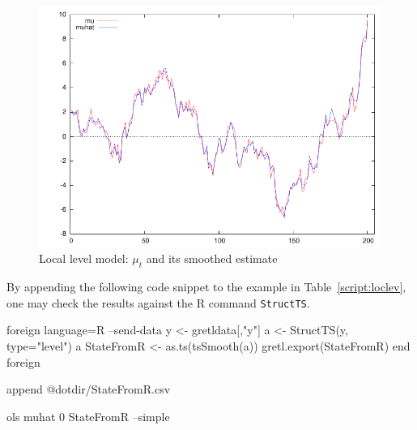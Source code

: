\begin{figure}[htbp]
  \centering
  \includegraphics{figures/local_level}
  \caption{Local level model: $\mu_t$ and its smoothed estimate}
  \label{fig:loclev}
\end{figure}
By appending the following code snippet to the example in
Table~\ref{script:loclev}, one may check the results against the
\textsf{R} command \texttt{StructTS}.

\begin{code}
foreign language=R --send-data
  y <- gretldata[,"y"]
  a <- StructTS(y, type="level")
  a
  StateFromR <- as.ts(tsSmooth(a))
  gretl.export(StateFromR)
end foreign

append @dotdir/StateFromR.csv

ols muhat 0 StateFromR --simple
\end{code}




